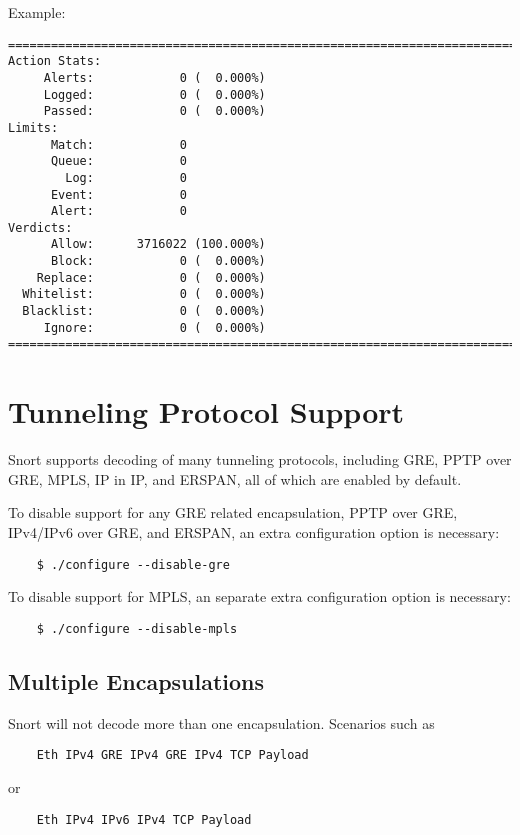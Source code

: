 \documentclass[english]{report}
\begin{document}
Example:

\begin{verbatim}
===============================================================================
Action Stats:
     Alerts:            0 (  0.000%)
     Logged:            0 (  0.000%)
     Passed:            0 (  0.000%)
Limits:
      Match:            0
      Queue:            0
        Log:            0
      Event:            0
      Alert:            0
Verdicts:
      Allow:      3716022 (100.000%)
      Block:            0 (  0.000%)
    Replace:            0 (  0.000%)
  Whitelist:            0 (  0.000%)
  Blacklist:            0 (  0.000%)
     Ignore:            0 (  0.000%)
===============================================================================
\end{verbatim}

\section{Tunneling Protocol Support}

Snort supports decoding of many tunneling protocols, including GRE, PPTP over GRE,
MPLS, IP in IP, and ERSPAN, all of which are enabled by default.  

To disable support for any GRE related encapsulation, PPTP over GRE, IPv4/IPv6 over
GRE, and ERSPAN, an extra configuration option is necessary:

\begin{verbatim}
    $ ./configure --disable-gre
\end{verbatim}

To disable support for MPLS, an separate extra configuration option is necessary:

\begin{verbatim}
    $ ./configure --disable-mpls
\end{verbatim}

\subsection{Multiple Encapsulations}

Snort will not decode more than one encapsulation.  Scenarios such as

\begin{verbatim}
    Eth IPv4 GRE IPv4 GRE IPv4 TCP Payload
\end{verbatim}

or

\begin{verbatim}
    Eth IPv4 IPv6 IPv4 TCP Payload
\end{verbatim}
\end{document}
